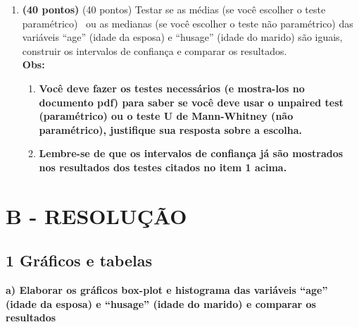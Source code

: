 \begin{enumerate}[label=\alph*)]
\item \textbf{(40 pontos)} (40 pontos) Testar se as médias (se você escolher o teste paramétrico) \ ou as medianas (se você escolher o teste não
paramétrico) das variáveis “age” (idade da esposa) e “husage” (idade do marido) são iguais, construir os intervalos de
confiança e comparar os resultados.\\
\textbf{Obs: }
\begin{enumerate}[label=\textbf{\arabic*)}, font=\bfseries]
\item \textbf{Você deve fazer os testes necessários (e mostra-los no documento pdf) para saber se você deve usar o unpaired test
(paramétrico) ou o teste U de Mann-Whitney (não paramétrico), justifique sua resposta sobre a escolha.}
\item \textbf{Lembre-se de que os intervalos de confiança já são mostrados nos resultados dos testes citados no item 1 acima. }
\end{enumerate}
\end{enumerate}









\section*{\textbf{B - RESOLUÇÃO}}
\subsection*{\textbf{1 Gráficos e tabelas}}
\begin{adjustwidth}{1em}{}
\textbf{a) Elaborar os gráficos box-plot e histograma das variáveis “age” (idade da esposa) e “husage” (idade do
marido) e comparar os resultados}
\end{adjustwidth}

